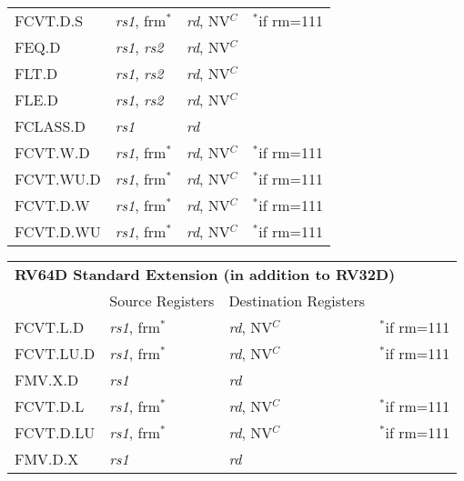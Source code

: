 \begin{tabular}{p{25mm}|p{3cm}|p{6cm}|p{10cm}}
   \cline{2-3}
   FCVT.D.S & {\em rs1}, frm$^*$ & {\em rd}, NV$^C$ & $^*$if rm=111 \\
   \cline{2-3}
   FEQ.D & {\em rs1}, {\em rs2} & {\em rd}, NV$^C$ &  \\
   \cline{2-3}
   FLT.D & {\em rs1}, {\em rs2} & {\em rd}, NV$^C$ &  \\
   \cline{2-3}
   FLE.D & {\em rs1}, {\em rs2} & {\em rd}, NV$^C$ &  \\
   \cline{2-3}
   FCLASS.D & {\em rs1} & {\em rd} &  \\
   \cline{2-3}
   FCVT.W.D & {\em rs1}, frm$^*$ & {\em rd}, NV$^C$ & $^*$if rm=111 \\
   \cline{2-3}
   FCVT.WU.D & {\em rs1}, frm$^*$ & {\em rd}, NV$^C$ & $^*$if rm=111 \\
   \cline{2-3}
   FCVT.D.W & {\em rs1}, frm$^*$ & {\em rd}, NV$^C$ & $^*$if rm=111 \\
   \cline{2-3}
   FCVT.D.WU & {\em rs1}, frm$^*$ & {\em rd}, NV$^C$ & $^*$if rm=111 \\
   \cline{2-3}
\end{tabular}

\begin{tabular}{p{25mm}|p{3cm}|p{6cm}|p{10cm}}
  \multicolumn{4}{l}{\bf RV64D Standard Extension (in addition to RV32D)} \\
  \cline{2-3}
   & Source Registers & Destination Registers \\
  \cline{2-3}
   FCVT.L.D & {\em rs1}, frm$^*$ & {\em rd}, NV$^C$ & $^*$if rm=111 \\
   \cline{2-3}
   FCVT.LU.D & {\em rs1}, frm$^*$ & {\em rd}, NV$^C$ & $^*$if rm=111 \\
   \cline{2-3}
   FMV.X.D & {\em rs1} & {\em rd} &  \\
   \cline{2-3}
   FCVT.D.L & {\em rs1}, frm$^*$ & {\em rd}, NV$^C$ & $^*$if rm=111 \\
   \cline{2-3}
   FCVT.D.LU & {\em rs1}, frm$^*$ & {\em rd}, NV$^C$ & $^*$if rm=111 \\
   \cline{2-3}
   FMV.D.X & {\em rs1} & {\em rd} &  \\
   \cline{2-3}
\end{tabular}
